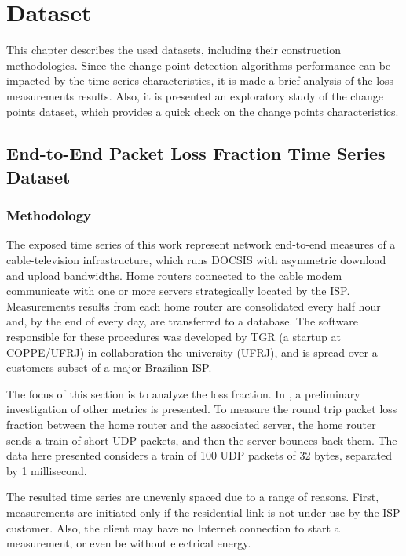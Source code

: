 \chapter{Dataset}

This chapter describes the used datasets, including their construction methodologies. Since the change point detection algorithms performance can be impacted by the time series characteristics, it is made a brief analysis of the loss measurements results. Also, it is presented an exploratory study of the change points dataset, which provides a quick check on the change points characteristics. 

\section{End-to-End Packet Loss Fraction Time Series Dataset}

\subsection{Methodology}

The exposed time series of this work represent network end-to-end measures of a cable-television infrastructure, which runs DOCSIS with asymmetric download and upload bandwidths. Home routers connected to the cable modem communicate with one or more servers strategically located by the ISP. Measurements results from each home router are consolidated every half hour and, by the end of every day, are transferred to a database. The software responsible for these procedures was developed by TGR (a startup at COPPE/UFRJ) in collaboration the university (UFRJ), and is spread over a customers subset of a major Brazilian ISP.

The focus of this section is to analyze the loss fraction. In \cite{a_preliminary_performance_measurement_study_of_residential_broadband_services_in_brazil}, a preliminary investigation of other metrics is presented. To measure the round trip packet loss fraction between the home router and the associated server, the home router sends a train of short UDP packets, and then the server bounces back them. The data here presented considers a train of 100 UDP packets of 32 bytes, separated by 1 millisecond.

The resulted time series are unevenly spaced due to a range of reasons. First, measurements are initiated only if the residential link is not under use by the ISP customer. Also, the client may have no Internet connection to start a measurement, or even be without electrical energy.

